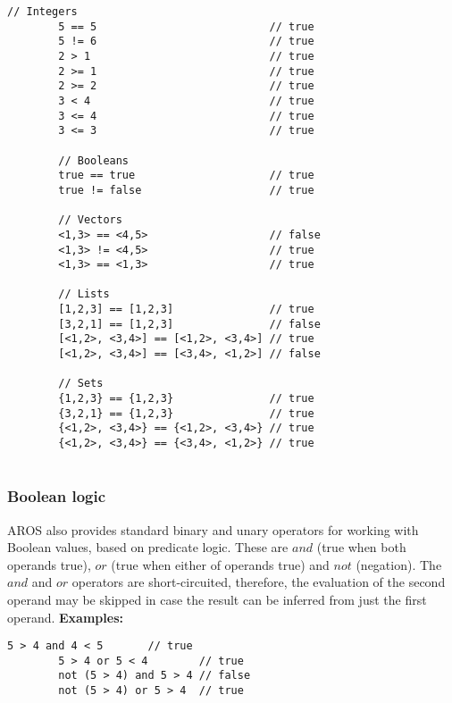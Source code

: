     \begin{lstlisting}[language=aros,caption=Comparison operator examples]
        // Integers
        5 == 5                           // true
        5 != 6                           // true
        2 > 1                            // true
        2 >= 1                           // true
        2 >= 2                           // true
        3 < 4                            // true
        3 <= 4                           // true
        3 <= 3                           // true
        
        // Booleans
        true == true                     // true
        true != false                    // true
        
        // Vectors
        <1,3> == <4,5>                   // false
        <1,3> != <4,5>                   // true
        <1,3> == <1,3>                   // true
        
        // Lists
        [1,2,3] == [1,2,3]               // true 
        [3,2,1] == [1,2,3]               // false
        [<1,2>, <3,4>] == [<1,2>, <3,4>] // true
        [<1,2>, <3,4>] == [<3,4>, <1,2>] // false
        
        // Sets
        {1,2,3} == {1,2,3}               // true 
        {3,2,1} == {1,2,3}               // true
        {<1,2>, <3,4>} == {<1,2>, <3,4>} // true
        {<1,2>, <3,4>} == {<3,4>, <1,2>} // true
        
    \end{lstlisting}
\subsubsection{Boolean logic}
    AROS also provides standard binary and unary operators for working with Boolean values, based on predicate logic. These are $and$ (true when both operands true), $or$ (true when either of operands true) and $not$ (negation). The $and$ and $or$ operators are short-circuited, therefore, the evaluation of the second operand may be skipped in case the result can be inferred from just the first operand.  
    \newline \textbf{Examples:}
    \begin{lstlisting}[language=aros,caption=Boolean logic examples]
        5 > 4 and 4 < 5       // true 
        5 > 4 or 5 < 4        // true
        not (5 > 4) and 5 > 4 // false
        not (5 > 4) or 5 > 4  // true
    \end{lstlisting}
